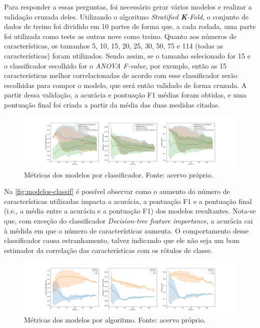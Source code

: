 \documentclass[12pt]{article}
\begin{document}
Para responder a essas perguntas, foi necessário gerar vários modelos e realizar a validação cruzada deles. Utilizando o algoritmo \textit{Stratified \textbf{K}-Fold}, o conjunto de dados de treino foi dividido em 10 partes de forma que, a cada rodada, uma parte foi utilizada como teste as outras nove como treino. Quanto aos números de características, os tamanhos 5, 10, 15, 20, 25, 30, 50, 75 e 114 (todas as características) foram utilizados. Sendo assim, se o tamanho selecionado for 15 e o classificador escolhido for o \textit{ANOVA F-value}, por exemplo, então as 15 características melhor correlacionadas de acordo com esse classificador serão escolhidas para compor o modelo, que será então validado de forma cruzada. A partir dessa validação, a acurácia e pontuação F1 médias foram obtidas, e uma pontuação final foi criada a partir da média das duas medidas citadas.

\begin{figure}[t!]
    \includegraphics[width=\linewidth]{figures/modelos_por_classificador}
    \caption{Métricas dos modelos por classificador. Fonte: acervo próprio.}
    \label{fig:modelos-classif}
\end{figure}

Na \autoref{fig:modelos-classif} é possível observar como o aumento do número de características utilizadas impacta a acurácia, a pontuação F1 e a pontuação final (i.e., a média entre a acurácia e a pontuação F1) dos modelos resultantes. Nota-se que, com exceção do classificador \textit{Decision-tree feature importance}, a acurácia cai à médida em que o número de características aumenta. O comportamento desse classificador causa estranhamento, talvez indicando que ele não seja um bom estimador da correlação das características com os rótulos de classe.

\begin{figure}[t!]
    \includegraphics[width=\linewidth]{figures/modelos_por_algoritmo}
    \caption{Métricas dos modelos por algoritmo. Fonte: acervo próprio.}
    \label{fig:modelos-alg}
\end{figure}
\end{document}
